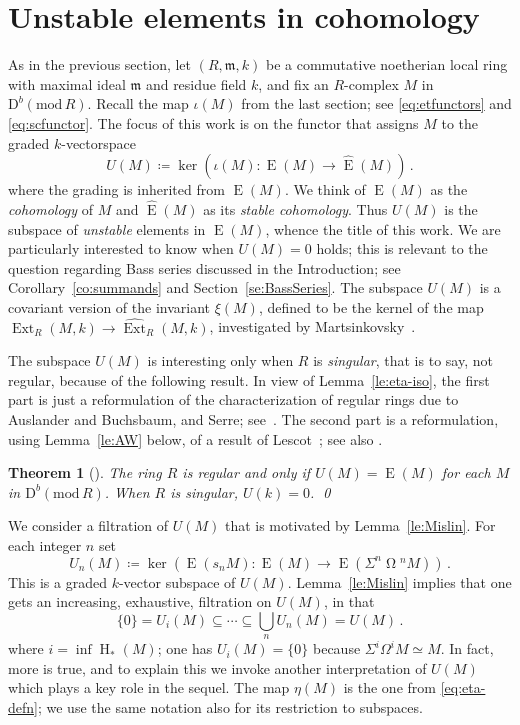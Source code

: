 \documentclass{amsart}
\numberwithin{equation}{section}
\theoremstyle{plain}
\newtheorem{theorem}[equation]{Theorem}
\theoremstyle{definition}
\theoremstyle{remark}
\newcommand{\dbcat}[1]{\mathrm{D}^b(\mathrm{mod}\,{#1})}
\newcommand{\eee}{\operatorname{E}}
\newcommand{\ext}{\operatorname{Ext}}
\newcommand{\hh}{\operatorname{H}}
\newcommand{\syz}{\operatorname{\Omega}\!}
\newcommand{\fm}{\mathfrak{m}}
\begin{document}
\section{Unstable elements in cohomology}
\label{se:Uspace}
As in the previous section, let $(R,\mathfrak{m},k)$ be a commutative noetherian local ring with maximal ideal $\fm$ and residue field $k$, and fix an $R$-complex $M$ in $\dbcat R$. Recall the map $\iota(M)$ from the last section; see \eqref{eq:etfunctors} and \eqref{eq:scfunctor}. The focus of this work is on the functor that assigns $M$ to the graded $k$-vectorspace
\begin{equation}
\label{eq:U-defn}
U(M)\coloneqq \ker(\iota(M)\colon \eee(M) \longrightarrow  \widehat{\eee}(M))\,.    
\end{equation}
where the grading is inherited from $\eee(M)$. We think of $\eee(M)$ as the \emph{cohomology} of $M$ and $\widehat{\eee}(M)$ as its \emph{stable cohomology}. Thus $U(M)$ is the subspace of \emph{unstable} elements in $\eee(M)$, whence the title of this work. We are particularly interested to know when $U(M)=0$ holds; this is relevant to the question regarding Bass series discussed in the Introduction; see Corollary~\ref{co:summands} and Section~\ref{se:BassSeries}.  The subspace $U(M)$ is a covariant version of the invariant $\xi(M)$, defined to be the kernel of the map $\ext_R(M,k)\to \widehat{\ext}_R(M,k)$, investigated by Martsinkovsky~\cite{Martsinkovsky:1996b, Martsinkovsky:2000a}.

The subspace $U(M)$ is interesting only when $R$ is \emph{singular}, that is to say, not regular, because of the following result. In view of Lemma~\ref{le:eta-iso}, the first part is just a reformulation of the characterization of regular rings due to Auslander and Buchsbaum, and Serre; see~\cite[Theorem~2.2.7]{Bruns/Herzog:1998a}. The second part is a reformulation, using Lemma~\ref{le:AW} below, of a result of Lescot~\cite[1.6]{Lescot:1983}; see also \cite[Theorem~5.1.8]{Avramov/Veliche:2007}.

\begin{theorem}[\cite{Lescot:1983}]
\label{th:U-Rk}
The ring $R$ is regular and only if  $U(M) = \eee(M)$ for each $M$ in $\dbcat R$. When  $R$ is singular, $U(k)=0$. \qed
\end{theorem}

We consider a filtration of $U(M)$ that is motivated by Lemma~\ref{le:Mislin}. For each integer $n$ set
\begin{equation}
\label{eq:Ufiltration}
U_n(M) \coloneqq \ker\left(\eee(s_nM)\colon \eee(M)\longrightarrow \eee(\Sigma^n\syz^n M)\right)\,.    
\end{equation}
This is a graded $k$-vector subspace of $U(M)$. Lemma~\ref{le:Mislin} implies that one gets an increasing, exhaustive, filtration on $U(M)$, in that
\[
\{0\}= U_{i}(M) \subseteq \cdots \subseteq \bigcup_n U_{n}(M) = U(M)\,.
\]
where $i=\inf\hh_*(M)$; one has $U_i(M)=\{0\}$ because $\Sigma^i\Omega^iM\simeq M$.  In fact, more is true, and to explain this we invoke another interpretation of $U(M)$ which plays a key role in the sequel.  The map $\eta(M)$ is the one from \eqref{eq:eta-defn}; we use the same notation also for its restriction to subspaces.
\end{document}

